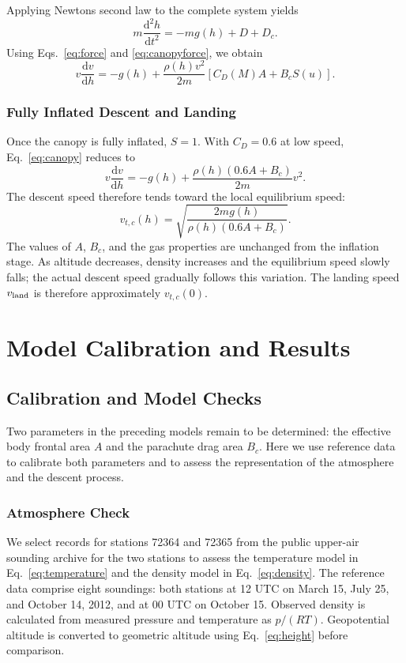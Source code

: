 \documentclass[12pt,a4paper]{article}
\numberwithin{equation}{section}
\begin{document}
Applying Newton\textquotesingle s second law to the complete system yields
\[
 m\frac{\mathrm d^2h}{\mathrm dt^2}=-mg(h)+D+D_c.
\]
Using Eqs.~\eqref{eq:force} and \eqref{eq:canopyforce}, we obtain
\begin{equation}
 v\frac{\mathrm dv}{\mathrm dh}=-g(h)+\frac{\rho(h)v^2}{2m}\left[C_D(M)A+B_cS(u)\right].
 \label{eq:canopy}
\end{equation}

\subsubsection{Fully Inflated Descent and Landing}\label{sec:landingmodel}
Once the canopy is fully inflated, $S=1$. With $C_D=0.6$ at low speed, Eq.~\eqref{eq:canopy} reduces to
\begin{equation}
 v\frac{\mathrm dv}{\mathrm dh}=-g(h)+\frac{\rho(h)(0.6A+B_c)}{2m}v^2.
 \label{eq:postcanopy}
\end{equation}
The descent speed therefore tends toward the local equilibrium speed:
\begin{equation}
 v_{t,c}(h)=\sqrt{\frac{2mg(h)}{\rho(h)(0.6A+B_c)}}.
 \label{eq:canopyterminal}
\end{equation}
The values of $A$, $B_c$, and the gas properties are unchanged from the inflation stage. As altitude decreases, density increases and the equilibrium speed slowly falls; the actual descent speed gradually follows this variation. The landing speed $v_{\rm land}$ is therefore approximately $v_{t,c}(0)$.

\section{Model Calibration and Results}
\subsection{Calibration and Model Checks}
Two parameters in the preceding models remain to be determined: the effective body frontal area $A$ and the parachute drag area $B_c$. Here we use reference data to calibrate both parameters and to assess the representation of the atmosphere and the descent process.

\subsubsection{Atmosphere Check}
We select records for stations 72364 and 72365 from the public upper-air sounding archive for the two stations to assess the temperature model in Eq.~\eqref{eq:temperature} and the density model in Eq.~\eqref{eq:density}. The reference data comprise eight soundings: both stations at 12 UTC on March 15, July 25, and October 14, 2012, and at 00 UTC on October 15. Observed density is calculated from measured pressure and temperature as $p/(RT)$. Geopotential altitude is converted to geometric altitude using Eq.~\eqref{eq:height} before comparison.
\end{document}
